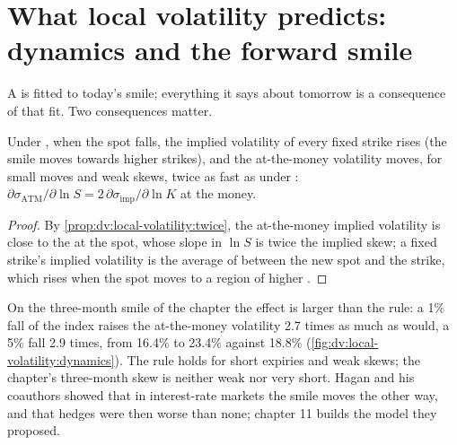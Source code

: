 \section{What local volatility predicts: dynamics and the forward smile}

A  is fitted to today's smile; everything it says about tomorrow is a consequence of
that fit. Two consequences matter.

\begin{proposition}\label{prop:dv:local-volatility:dynamics}
Under , when the spot falls, the implied volatility of every fixed strike rises (the smile
moves towards higher strikes), and the at-the-money volatility moves, for small moves and weak skews, twice
as fast as under : $\partial\sigma_{\mathrm{ATM}}/\partial\ln S=2\,\partial\sigma_{\mathrm{imp}}
/\partial\ln K$ at the money.
\end{proposition}
\begin{proof}
By \cref{prop:dv:local-volatility:twice}, the at-the-money implied volatility is close to the  at the spot, whose slope in $\ln S$ is twice the implied skew; a fixed strike's implied volatility
is the average of  between the new spot and the strike, which rises when the spot moves to
a region of higher .
\end{proof}

On the three-month smile of the chapter the effect is larger than the rule: a 1\% fall of the index raises
the at-the-money volatility 2.7 times as much as  would, a 5\% fall 2.9 times, from 16.4\% to
23.4\% against 18.8\% (\cref{fig:dv:local-volatility:dynamics}). The rule holds for short expiries and weak
skews; the chapter's three-month skew is neither weak nor very short. Hagan and his coauthors showed that in
interest-rate markets the smile moves the other way, and that  hedges were then worse than
none; chapter 11 builds the model they proposed.


